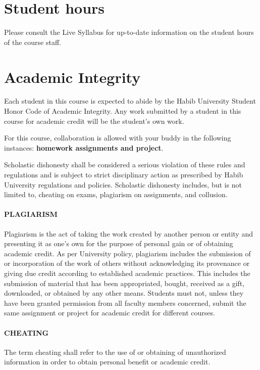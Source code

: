 \documentclass[a4paper]{article}
\begin{document}
\section{Student hours}

Please consult the Live Syllabus for up-to-date information on the student hours of the course staff. 

\section{Academic Integrity}

Each student in this course is expected to abide by the Habib University Student Honor Code of Academic Integrity. Any work submitted by a student in this course for academic credit will be the student's own work. 

For this course, collaboration is allowed with your buddy in the following instances: \textbf{homework assignments and project}.

Scholastic dishonesty shall be considered a serious violation of these rules and regulations and is subject to strict disciplinary action as prescribed by Habib University regulations and policies. Scholastic dishonesty includes, but is not limited to, cheating on exams, plagiarism on assignments, and collusion. 

\paragraph{PLAGIARISM} Plagiarism is the act of taking the work created by another person or entity and presenting it as one’s own for the purpose of personal gain or of obtaining academic credit. As per University policy, plagiarism includes the submission of or incorporation of the work of others without acknowledging its provenance or giving due credit according to established academic practices. This includes the submission of material that has been appropriated, bought, received as a gift, downloaded, or obtained by any other means. Students must not, unless they have been granted permission from all faculty members concerned, submit the same assignment or project for academic credit for different courses. 

\paragraph{CHEATING} The term cheating shall refer to the use of or obtaining of unauthorized information in order to obtain personal benefit or academic credit. 
\end{document}
